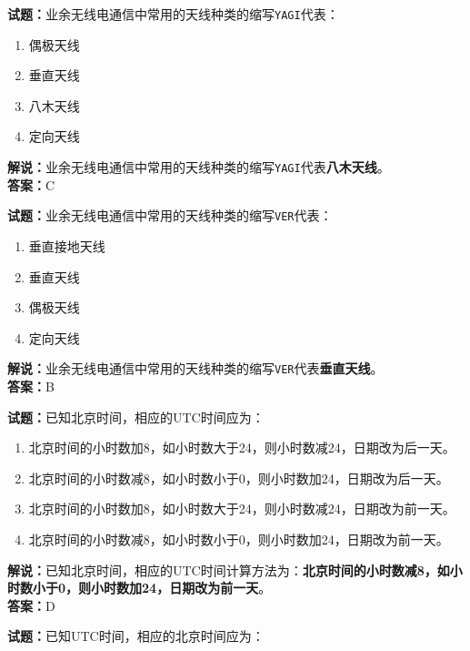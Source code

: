 \documentclass{ctexbook}
\begin{document}
\noindent\textbf{试题：}业余无线电通信中常用的天线种类的缩写\texttt{YAGI}代表：

\begin{enumerate}[leftmargin=3em]
  \item 偶极天线
  \item 垂直天线
  \item 八木天线
  \item 定向天线
\end{enumerate}

\noindent\textbf{解说：}业余无线电通信中常用的天线种类的缩写\texttt{YAGI}代表\textbf{八木天线}。\\\noindent\textbf{答案：}C

\bigskip

\noindent\textbf{试题：}业余无线电通信中常用的天线种类的缩写\texttt{VER}代表：

\begin{enumerate}[leftmargin=3em]
  \item 垂直接地天线
  \item 垂直天线
  \item 偶极天线
  \item 定向天线
\end{enumerate}

\noindent\textbf{解说：}业余无线电通信中常用的天线种类的缩写\texttt{VER}代表\textbf{垂直天线}。\\\noindent\textbf{答案：}B

\bigskip

\noindent\textbf{试题：}已知北京时间，相应的UTC时间应为：

\begin{enumerate}[leftmargin=3em]
  \item 北京时间的小时数加8，如小时数大于24，则小时数减24，日期改为后一天。
  \item 北京时间的小时数减8，如小时数小于0，则小时数加24，日期改为后一天。
  \item 北京时间的小时数加8，如小时数大于24，则小时数减24，日期改为前一天。
  \item 北京时间的小时数减8，如小时数小于0，则小时数加24，日期改为前一天。
\end{enumerate}

\noindent\textbf{解说：}已知北京时间，相应的UTC时间计算方法为：\textbf{北京时间的小时数减8，如小时数小于0，则小时数加24，日期改为前一天}。\\\noindent\textbf{答案：}D

\bigskip

\noindent\textbf{试题：}已知UTC时间，相应的北京时间应为：
\end{document}
